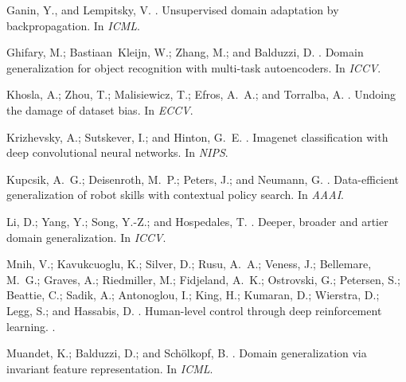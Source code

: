 \documentclass[letterpaper]{article} \usepackage{aaai18}  \usepackage{times}  \usepackage{helvet}  \usepackage{courier}  \usepackage{url}  \usepackage{graphicx}  \usepackage{amsmath}
\begin{document}
{{\begin{thebibliography}{}
Ganin, Y., and Lempitsky, V.
.
\newblock Unsupervised domain adaptation by backpropagation.
\newblock In {\em ICML}.

Ghifary, M.; Bastiaan~Kleijn, W.; Zhang, M.; and Balduzzi, D.
.
\newblock Domain generalization for object recognition with multi-task
  autoencoders.
\newblock In {\em ICCV}.

Khosla, A.; Zhou, T.; Malisiewicz, T.; Efros, A.~A.; and Torralba, A.
.
\newblock Undoing the damage of dataset bias.
\newblock In {\em ECCV}.

Krizhevsky, A.; Sutskever, I.; and Hinton, G.~E.
.
\newblock Imagenet classification with deep convolutional neural networks.
\newblock In {\em NIPS}.

Kupcsik, A.~G.; Deisenroth, M.~P.; Peters, J.; and Neumann, G.
.
\newblock Data-efficient generalization of robot skills with contextual policy
  search.
\newblock In {\em AAAI}.

Li, D.; Yang, Y.; Song, Y.-Z.; and Hospedales, T.
.
\newblock Deeper, broader and artier domain generalization.
\newblock In {\em ICCV}.

Mnih, V.; Kavukcuoglu, K.; Silver, D.; Rusu, A.~A.; Veness, J.; Bellemare,
  M.~G.; Graves, A.; Riedmiller, M.; Fidjeland, A.~K.; Ostrovski, G.; Petersen,
  S.; Beattie, C.; Sadik, A.; Antonoglou, I.; King, H.; Kumaran, D.; Wierstra,
  D.; Legg, S.; and Hassabis, D.
.
\newblock Human-level control through deep reinforcement learning.
.

Muandet, K.; Balduzzi, D.; and Sch{\"o}lkopf, B.
.
\newblock Domain generalization via invariant feature representation.
\newblock In {\em ICML}.


\end{thebibliography}}}
\end{document}
